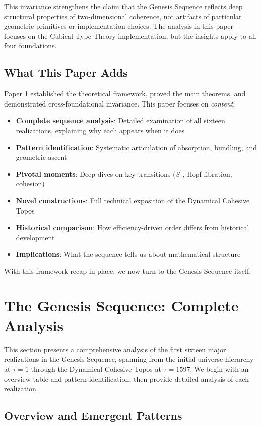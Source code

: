 \documentclass[11pt]{article}
\theoremstyle{definition}
\begin{document}
This invariance strengthens the claim that the Genesis Sequence reflects deep structural properties of two-dimensional coherence, not artifacts of particular geometric primitives or implementation choices. The analysis in this paper focuses on the Cubical Type Theory implementation, but the insights apply to all four foundations.

\subsection{What This Paper Adds}

Paper 1 established the theoretical framework, proved the main theorems, and demonstrated cross-foundational invariance. This paper focuses on \emph{content}:
\begin{itemize}
\item \textbf{Complete sequence analysis}: Detailed examination of all sixteen realizations, explaining why each appears when it does
\item \textbf{Pattern identification}: Systematic articulation of absorption, bundling, and geometric ascent
\item \textbf{Pivotal moments}: Deep dives on key transitions ($S^1$, Hopf fibration, cohesion)
\item \textbf{Novel constructions}: Full technical exposition of the Dynamical Cohesive Topos
\item \textbf{Historical comparison}: How efficiency-driven order differs from historical development
\item \textbf{Implications}: What the sequence tells us about mathematical structure
\end{itemize}

With this framework recap in place, we now turn to the Genesis Sequence itself.

\section{The Genesis Sequence: Complete Analysis}
\label{sec:genesis-complete}

This section presents a comprehensive analysis of the first sixteen major realizations in the Genesis Sequence, spanning from the initial universe hierarchy at $\tau=1$ through the Dynamical Cohesive Topos at $\tau=1597$. We begin with an overview table and pattern identification, then provide detailed analysis of each realization.

\subsection{Overview and Emergent Patterns}
\end{document}
